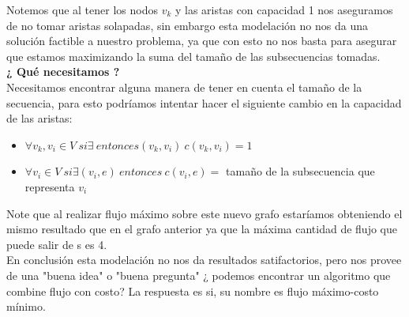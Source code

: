 \documentclass[sn-mathphys,Numbered]{sn-jnl}%
\theoremstyle{thmstyleone}%
\theoremstyle{thmstyletwo}%
\theoremstyle{thmstylethree}%
\begin{document}
Notemos que al tener los nodos $v_k$ y las aristas con capacidad 1
nos aseguramos de no tomar aristas solapadas, sin embargo esta modelaci\'on no nos da una soluci\'on factible a nuestro problema, ya que con esto no nos basta para asegurar que estamos maximizando la suma del tama\~no de las subsecuencias tomadas.\\
\textbf{¿ Qu\'e necesitamos ?}\\
Necesitamos encontrar alguna manera de tener en cuenta el tama\~no de la secuencia, para esto podr\'iamos intentar hacer el siguiente cambio en la capacidad de las aristas:
\begin{itemize}
    \item $\forall v_k,v_i \in V~si \exists~entonces(v_k,v_i) ~c(v_k,v_i) = 1$
    \item $\forall v_i \in V ~si \exists(v_i,e)~ entonces~c(v_i,e) = $ tama\~no de la subsecuencia que representa $v_i$
\end{itemize}
Note que al realizar flujo m\'aximo sobre este nuevo grafo estar\'iamos obteniendo el mismo resultado que en el grafo anterior ya que la m\'axima cantidad de flujo que puede salir de s es 4.\\
En conclusi\'on esta modelaci\'on no nos da resultados satifactorios, pero nos provee de una "buena idea" o "buena pregunta" ¿ podemos encontrar un algoritmo que combine flujo con costo?  
La respuesta es si, su nombre es flujo máximo-costo mínimo. \\
\end{document}
